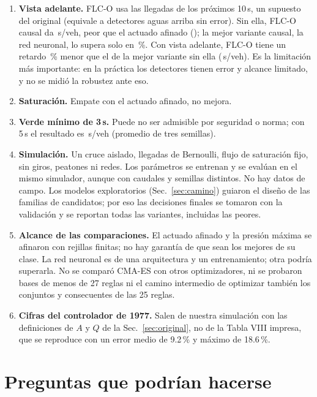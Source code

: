 \documentclass[11pt,a4paper]{article}
\newcommand{\FLC}{FLC-O}
\begin{document}
\begin{enumerate}
\item \textbf{Vista adelante.} \FLC{} usa las llegadas de los próximos 10\,s, un supuesto del original (equivale a detectores aguas arriba sin error). Sin ella, \FLC{} causal da \DelayOfFlcC{}\,s/veh, peor que el actuado afinado (\DelayOfActAf{}); la mejor variante causal, la red neuronal, lo supera solo en \RedActMlpC\,\%. Con vista adelante, \FLC{} tiene un retardo \JGanaVista\,\% menor que el de la mejor variante sin ella (\DelayOfMlpC{}\,s/veh). Es la limitación más importante: en la práctica los detectores tienen error y alcance limitado, y no se midió la robustez ante eso.
\item \textbf{Saturación.} Empate con el actuado afinado, no mejora.
\item \textbf{Verde mínimo de 3\,s.} Puede no ser admisible por seguridad o norma; con 5\,s el resultado es \MedOfGCinco{}\,s/veh (promedio de tres semillas).
\item \textbf{Simulación.} Un cruce aislado, llegadas de Bernoulli, flujo de saturación fijo, sin giros, peatones ni redes. Los parámetros se entrenan y se evalúan en el mismo simulador, aunque con caudales y semillas distintos. No hay datos de campo. Los modelos exploratorios (Sec.~\ref{sec:camino}) guiaron el diseño de las familias de candidatos; por eso las decisiones finales se tomaron con la validación y se reportan todas las variantes, incluidas las peores.
\item \textbf{Alcance de las comparaciones.} El actuado afinado y la presión máxima se afinaron con rejillas finitas; no hay garantía de que sean los mejores de su clase. La red neuronal es de una arquitectura y un entrenamiento; otra podría superarla. No se comparó CMA-ES con otros optimizadores, ni se probaron bases de menos de 27 reglas ni el camino intermedio de optimizar también los conjuntos y consecuentes de las 25 reglas.
\item \textbf{Cifras del controlador de 1977.} Salen de nuestra simulación con las definiciones de $A$ y $Q$ de la Sec.~\ref{sec:original}, no de la Tabla VIII impresa, que se reproduce con un error medio de 9.2\,\% y máximo de 18.6\,\%.
\end{enumerate}

\section{Preguntas que podrían hacerse}
\label{sec:preguntas}
\end{document}
